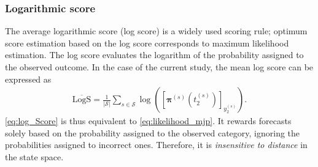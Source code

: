 \subsubsection{Logarithmic score}
The average logarithmic score (log score) is a widely used scoring rule; optimum score estimation based on the log score corresponds to maximum likelihood estimation. The log score evaluates the logarithm of the probability assigned to the observed outcome. In the case of the current study, the mean log score can be expressed as
\begin{align}
    \overline{\text{LogS}} = \frac{1}{\vert \mathcal{S} \vert} \sum_{s \in \mathcal{S}} \log \left( \left[ \bm{\pi}^{(s)}\left( t_2^{(s)} \right)  \right]_{ y_2^{(s)}} \right).  \label{eq:log_Score}
\end{align}
\cref{eq:log_Score} is thus equivalent to \cref{eq:likelihood_mjp}.
It rewards forecasts solely based on the probability assigned to the observed category, ignoring the probabilities assigned to incorrect ones. Therefore, it is \textit{insensitive to distance} in the state space.  

%


